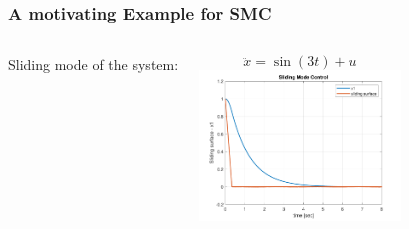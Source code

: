 \begin{frame}
  \frametitle{A motivating Example for SMC}

 \begin{columns}
   Sliding mode of the system:

   \begin{equation}
   \ddot x = \sin(3 t) + u 
   \end{equation}
   \centering
    \includegraphics[height=4cm]{./pictures/SMCutkinRoadmap.pdf}
\end{columns}
 \end{frame}
